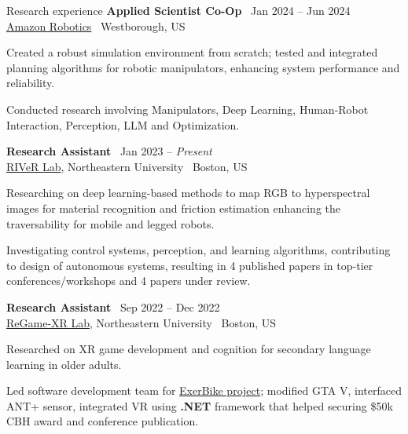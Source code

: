 \documentclass{resume}
\begin{document}
\begin{rSection}{Research experience}
{\bf Applied Scientist Co-Op} \hfill {\ Jan 2024 -- Jun 2024 }\\ 
{\href{https://www.aboutamazon.com/news/tag/robotics}{Amazon Robotics}} \hfill {\ {Westborough, US}}
\begin{cvitems}
    \item Created a robust simulation environment from scratch; tested and integrated planning algorithms for robotic manipulators, enhancing system performance and reliability.
    \item Conducted research involving Manipulators, Deep Learning, Human-Robot Interaction, Perception, LLM and Optimization.
\end{cvitems}
{\bf Research Assistant} \hfill {\ Jan 2023 -- \textit{Present} }\\ 
{\href{https://robot.neu.edu/}{RIVeR Lab}, Northeastern University} \hfill {\ {Boston, US}}
\begin{cvitems}
    \item Researching on deep learning-based methods to map RGB to hyperspectral images for material recognition and friction estimation enhancing the traversability for mobile and legged robots.
    \item Investigating control systems, perception, and learning algorithms, contributing to design of autonomous systems, resulting in 4 published papers in top-tier conferences/workshops and 4 papers under review.
\end{cvitems}
{\bf Research Assistant} \hfill {\ Sep 2022 -- Dec 2022 }\\ 
{\href{https://regamexr.sites.northeastern.edu/}{ReGame-XR Lab}, Northeastern University} \hfill {\ {Boston, US}}
\begin{cvitems}
    \item Researched on XR game development and cognition for secondary language learning in older adults.
    \item Led software development team for \href{https://games.northeastern.edu/project/exerbike/}{ExerBike project}; modified GTA V, interfaced ANT+ sensor, integrated VR using \textbf{.NET} framework that helped securing \$50k CBH award and conference publication.

\end{cvitems}
\end{rSection}
\end{document}
